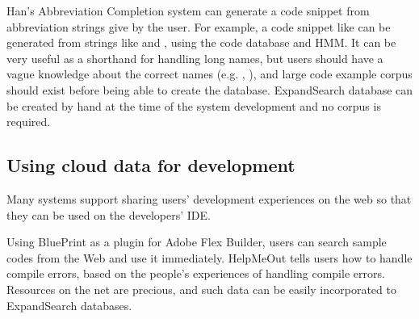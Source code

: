 \documentclass[manuscript,anonymous,review]{acmart}
\def\ES{\textsf{ExpandSearch}}
\begin{document}
Han's Abbreviation Completion system\cite{Han:2009:CCA:1747491.1747530}
can generate a code snippet from abbreviation strings give by the user.
For example, a code snippet like 
can be generated from strings like
 and , using the code database and HMM.
It can be very useful as a shorthand for handling long names,
but users should have a vague knowledge about the correct names
(e.g. , ),
and large code example corpus should exist before being able to
create the database.
{\ES} database can be created by hand at the time of the system development
and no corpus is required.


\subsection{Using cloud data for development}


Many systems support sharing users' development experiences on the web so that
they can be used on the developers' IDE.

Using BluePrint\cite{Brandt:2010:EPI:1753326.1753402}
as a plugin for Adobe Flex Builder,
users can search sample codes from the Web and use it immediately.
%
HelpMeOut\cite{Hartmann:2010:OPS:1753326.1753478} tells users
how to handle compile errors,
based on the people's experiences of handling compile errors.
%
Resources on the net are precious, and such data can be
easily incorporated to {\ES} databases.


% 
% 
% 
\end{document}
